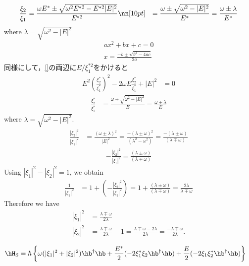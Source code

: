 \begin{align}
    \frac{\xi_2}{\xi_1}&=\frac{\omega E^{\ast}\pm\sqrt{\omega^2E^{\ast2}-E^{\ast2}|E|^2}}{E^{\ast2}}\nn[10pt]
    &=\frac{\omega \pm\sqrt{\omega^2-|E|^2}}{E^{\ast}}
    =\frac{\omega \pm\lambda}{E^{\ast}}
\end{align}
where $\lambda=\sqrt{\omega^2-|E|^2}$
\begin{align}
    ax^2+bx+c=0\\[10pt]
    x=\frac{-b\pm\sqrt{b^2-4ac}}{2a}
\end{align}
同様にして，\eqref{}の両辺に$E/\xi_1^{\ast2}$をかけると
\begin{align}
    E^{2}\left(\frac{\xi_2^{\ast}}{\xi_1^{\ast}}\right)^{2}-2\omega E\frac{\xi_2^{\ast}}{\xi_1^{\ast}}
    +|E|^2
    &=0
\end{align}
\begin{align}
    \frac{\xi_2^{\ast}}{\xi_1^{\ast}}
    &=\frac{\omega \pm\sqrt{\omega^2-|E|^2}}{E}
    =\frac{\omega \pm\lambda}{E}
\end{align}
where $\lambda=\sqrt{\omega^2-|E|^2}$.
\begin{align}
    \frac{|\xi_2|^2}{|\xi_1|^2}
    &=\frac{(\omega \pm\lambda)^2}{|E|^2}
    =\frac{-(\lambda\pm\omega)^2}{(\lambda^2-\omega^2)}
    =\frac{-(\lambda\pm\omega)}{(\lambda\mp\omega)}
\end{align}
\begin{align}
    -\frac{|\xi_2|^2}{|\xi_1|^2}
    =\frac{(\lambda\pm\omega)}{(\lambda\mp\omega)}
\end{align}
Using $|\xi_1|^2-|\xi_2|^2=1$, we obtain
\begin{align}
    \frac{1}{|\xi_1|^2}&=1+\left(-\frac{|\xi_2|^2}{|\xi_1|^2}\right)
    =1+\frac{(\lambda\pm\omega)}{(\lambda\mp\omega)}=\frac{2\lambda}{\lambda\mp\omega}
\end{align}
Therefore we have
\begin{align}
    |\xi_1|^2&=\frac{\lambda\mp\omega}{2\lambda}\\[10pt]
    |\xi_2|^2&=\frac{\lambda\mp\omega}{2\lambda}-1=\frac{\lambda\mp\omega-2\lambda}{2\lambda}
    =\frac{-\lambda\mp\omega}{2\lambda}.
\end{align}



\begin{align}
    \hH_{\rm{S}}
    &=\hbar\left\{\omega(|\xi_1|^2+|\xi_2|^2)\hb^\dag\hb
    +\frac{E^\ast}{2}(-2\xi_1^{\ast}\xi_2\hb^\dag\hb)
    +\frac{E}{2}(-2\xi_1\xi_2^{\ast}\hb^\dag\hb)
    \right\}
\end{align}




